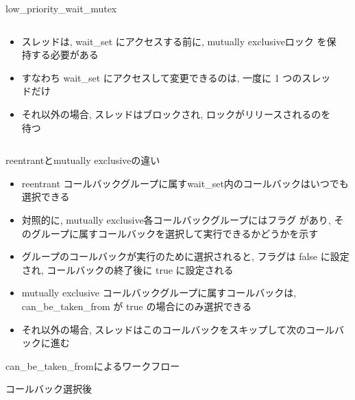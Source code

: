 \begin{frame}{low\_priority\_wait\_mutex}
    \begin{columns}
        \begin{column}{0.6\linewidth}
            \begin{itemize}
                \item スレッドは, wait\_set にアクセスする前に, mutually exclusiveロック  を保持する必要がある
                \item すなわち wait\_set にアクセスして変更できるのは, 一度に 1 つのスレッドだけ
                \item それ以外の場合, スレッドはブロックされ, ロックがリリースされるのを待つ
            \end{itemize}
        \end{column}
        \begin{column}{0.4\linewidth}
        \end{column}
    \end{columns}
\end{frame}

\begin{frame}{reentrantとmutually exclusiveの違い}
    \begin{itemize}
        \item reentrant コールバックグループに属すwait\_set内のコールバックはいつでも選択できる
        \item 対照的に, mutually exclusive各コールバックグループにはフラグ  があり, そのグループに属すコールバックを選択して実行できるかどうかを示す
        \item グループのコールバックが実行のために選択されると, フラグは false に設定され, コールバックの終了後に true に設定される
        \item mutually exclusive コールバックグループに属すコールバックは,  can\_be\_taken\_from が true の場合にのみ選択できる
        \item それ以外の場合, スレッドはこのコールバックをスキップして次のコールバックに進む
    \end{itemize}
\end{frame}

\begin{frame}{can\_be\_taken\_fromによるワークフロー}
\end{frame}

\begin{frame}{コールバック選択後}
\end{frame}

